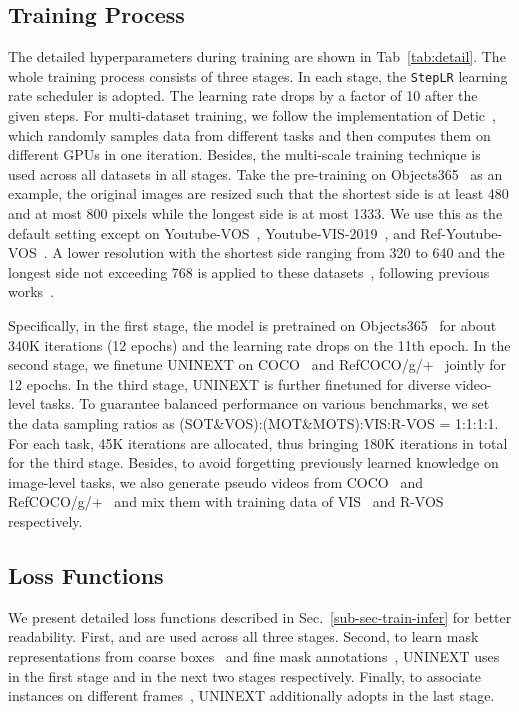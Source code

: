 \documentclass[10pt,twocolumn,letterpaper]{article}
\begin{document}
\subsection{Training Process}
\label{sec-train-detail}
The detailed hyperparameters during training are shown in Tab~\ref{tab:detail}. The whole training process consists of three stages. In each stage, the \texttt{StepLR} learning rate scheduler is adopted. The learning rate drops by a factor of 10 after the given steps. For multi-dataset training, we follow the implementation of Detic~\cite{Detic}, which randomly samples data from different tasks and then computes them on different GPUs in one iteration. Besides, the multi-scale training technique is used across all datasets in all stages. Take the pre-training on Objects365~\cite{Objects365} as an example, the original images are resized such that the shortest side is at least 480 and at most 800 pixels while the longest side is at most 1333. We use this as the default setting except on Youtube-VOS~\cite{YoutubeVOS}, Youtube-VIS-2019~\cite{VIS}, and Ref-Youtube-VOS~\cite{URVOS}. A lower resolution with the shortest side ranging from 320 to 640 and the longest side not exceeding 768 is applied to these datasets~\cite{YoutubeVOS,VIS,URVOS}, following previous works~\cite{IDOL,ReferFormer,STCN}.

Specifically, in the first stage, the model is pretrained on Objects365~\cite{Objects365} for about 340K iterations (12 epochs) and the learning rate drops on the 11th epoch. In the second stage, we finetune UNINEXT on COCO~\cite{COCO} and RefCOCO/g/+~\cite{RefCOCO&plus,RefCOCOg-umd} jointly for 12 epochs. In the third stage, UNINEXT is further finetuned for diverse video-level tasks. To guarantee balanced performance on various benchmarks, we set the data sampling ratios as (SOT\&VOS):(MOT\&MOTS):VIS:R-VOS = 1:1:1:1. For each task, 45K iterations are allocated, thus bringing 180K iterations in total for the third stage. Besides, to avoid forgetting previously learned knowledge on image-level tasks, we also generate pseudo videos from COCO~\cite{COCO} and RefCOCO/g/+~\cite{RefCOCO&plus, RefCOCOg-umd} and mix them with training data of VIS~\cite{VIS,OVIS} and R-VOS~\cite{URVOS} respectively.

\subsection{Loss Functions}
\label{loss-func}
We present detailed loss functions described in Sec.~\ref{sub-sec-train-infer} for better readability. First,  and  are used across all three stages. Second, to learn mask representations from coarse boxes~\cite{Objects365} and fine mask annotations~\cite{COCO,RefCOCO&plus,YoutubeVOS,VIS,URVOS}, UNINEXT uses  in the first stage and  in the next two stages respectively. Finally, to associate instances on different frames~\cite{BDD100K,VIS,OVIS}, UNINEXT additionally adopts  in the last stage.
\end{document}
